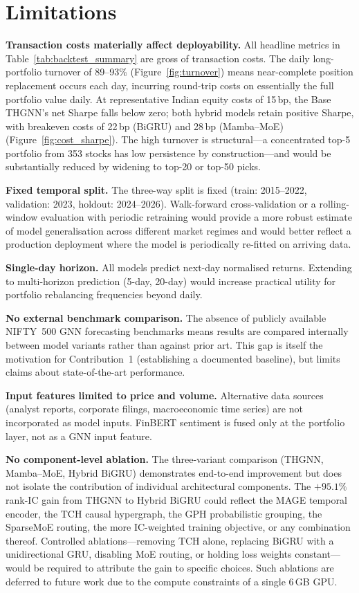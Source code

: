 \documentclass[a4paper,11pt]{report}
\begin{document}
\section{Limitations}

\textbf{Transaction costs materially affect deployability.} All headline metrics in Table~\ref{tab:backtest_summary} are gross of transaction costs. The daily long-portfolio turnover of 89--93\% (Figure~\ref{fig:turnover}) means near-complete position replacement occurs each day, incurring round-trip costs on essentially the full portfolio value daily. At representative Indian equity costs of 15\,bp, the Base THGNN's net Sharpe falls below zero; both hybrid models retain positive Sharpe, with breakeven costs of 22\,bp (BiGRU) and 28\,bp (Mamba--MoE) (Figure~\ref{fig:cost_sharpe}). The high turnover is structural---a concentrated top-5 portfolio from 353 stocks has low persistence by construction---and would be substantially reduced by widening to top-20 or top-50 picks.

\textbf{Fixed temporal split.} The three-way split is fixed (train: 2015--2022, validation: 2023, holdout: 2024--2026). Walk-forward cross-validation or a rolling-window evaluation with periodic retraining would provide a more robust estimate of model generalisation across different market regimes and would better reflect a production deployment where the model is periodically re-fitted on arriving data.

\textbf{Single-day horizon.} All models predict next-day normalised returns. Extending to multi-horizon prediction (5-day, 20-day) would increase practical utility for portfolio rebalancing frequencies beyond daily.

\textbf{No external benchmark comparison.} The absence of publicly available NIFTY~500 GNN forecasting benchmarks means results are compared internally between model variants rather than against prior art. This gap is itself the motivation for Contribution~1 (establishing a documented baseline), but limits claims about state-of-the-art performance.

\textbf{Input features limited to price and volume.} Alternative data sources (analyst reports, corporate filings, macroeconomic time series) are not incorporated as model inputs. FinBERT sentiment is fused only at the portfolio layer, not as a GNN input feature.

\textbf{No component-level ablation.} The three-variant comparison (THGNN, Mamba--MoE, Hybrid BiGRU) demonstrates end-to-end improvement but does not isolate the contribution of individual architectural components. The $+95.1\%$ rank-IC gain from THGNN to Hybrid BiGRU could reflect the MAGE temporal encoder, the TCH causal hypergraph, the GPH probabilistic grouping, the SparseMoE routing, the more IC-weighted training objective, or any combination thereof. Controlled ablations---removing TCH alone, replacing BiGRU with a unidirectional GRU, disabling MoE routing, or holding loss weights constant---would be required to attribute the gain to specific choices. Such ablations are deferred to future work due to the compute constraints of a single 6\,GB GPU.
\end{document}
